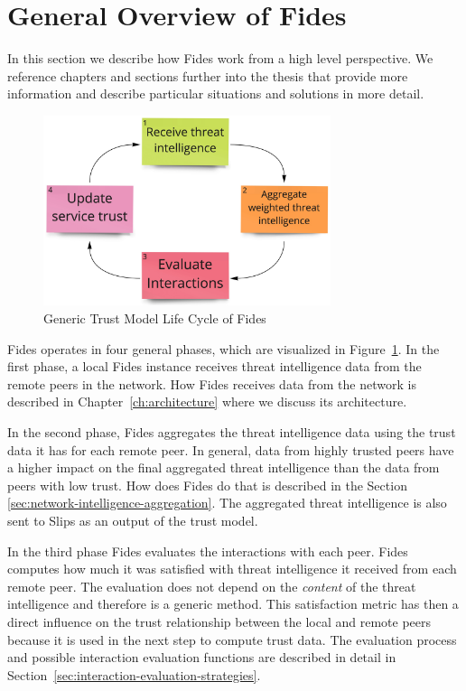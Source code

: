 \section{General Overview of Fides}
\label{sec:general-overview-of-fides}
In this section we describe how Fides work from a high level perspective. We reference chapters and sections further into the thesis that provide more information and describe particular situations and solutions in more detail.

\begin{figure}[ht!]
    \centering
    \includegraphics[width=0.75\textwidth]{assets/fides_lifecycle.jpeg}
    \caption{Generic Trust Model Life Cycle of Fides}
    \label{fig:trust-model-life-cycle}
\end{figure}

Fides operates in four general phases, which are visualized in Figure~\ref{fig:trust-model-life-cycle}.
In the first phase, a local Fides instance receives threat intelligence data from the remote peers in the network. 
How Fides receives data from the network is described in Chapter~\ref{ch:architecture} where we discuss its architecture.

In the second phase, Fides aggregates the threat intelligence data using the trust data it has for each remote peer.
In general, data from highly trusted peers have a higher impact on the final aggregated threat intelligence than the data from peers with low trust.
How does Fides do that is described in the Section~ \ref{sec:network-intelligence-aggregation}.
The aggregated threat intelligence is also sent to Slips as an output of the trust model.

In the third phase Fides evaluates the interactions with each peer.
Fides computes how much it was satisfied with threat intelligence it received from each remote peer. The evaluation does not depend on the \textit{content} of the threat intelligence and therefore is a generic method.
This satisfaction metric has then a direct influence on the trust relationship between the local and remote peers because it is used in the next step to compute trust data. 
The evaluation process and possible interaction evaluation functions are described in detail in Section~\ref{sec:interaction-evaluation-strategies}.

